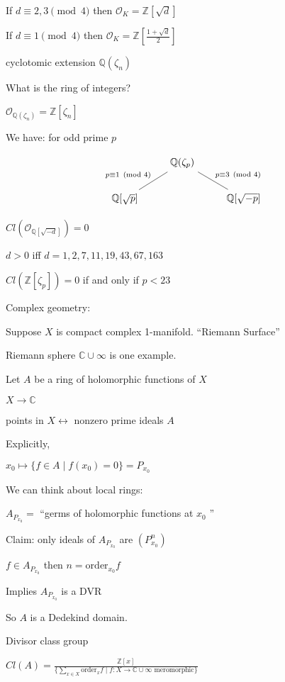 \documentclass{article}
\theoremstyle{definition}
\begin{document}
If \(d \equiv 2,3\pmod 4\) then \(\mathcal{O}_K = \mathbb{Z}[\sqrt{d}]\) 

If \(d \equiv 1\pmod 4\) then \(\mathcal{O}_K = \mathbb{Z}\left[ \frac{1+\sqrt{d}}{2} \right] \) 

cyclotomic extension \(\mathbb{Q}(\zeta_n)\)

What is the ring of integers?

\(\mathcal{O}_{\mathbb{Q}(\zeta_n)}=\mathbb{Z}[\zeta_n]\) 

We have: for odd prime \(p\)

\[
    \begin{tikzcd}
        & \mathbb{Q}(\zeta_p) & \\
        \mathbb{Q} [\sqrt{p}] \ar[ur, no head, "p\equiv 1 \pmod 4"] & & \mathbb{Q}[\sqrt{-p}] \ar[ul, no head, "p\equiv 3\pmod 4",swap]
    \end{tikzcd}
\]

\(Cl(\mathcal{O}_{\mathbb{Q}[\sqrt{-d}]}) = 0\)

\(d > 0\) iff \(d = 1,2,7,11,19,43,67,163\) 

\(Cl(\mathbb{Z}[\zeta_p])=0\) if and only if \(p < 23\) 

Complex geometry:

Suppose \(X\) is compact complex 1-manifold. ``Riemann Surface''

Riemann sphere \(\mathbb{C} \cup \infty\) is one example.

Let \(A\) be a ring of holomorphic functions of \(X\) 

\(X \to \mathbb{C}\) 

points in \(X \leftrightarrow\) nonzero prime ideals \(A\)

Explicitly,

\(x_0 \mapsto \{ f\in A \mid f(x_0)=0 \} = P_{x_0}\) 

We can think about local rings:

\(A_{P_{x_0}}=\) ``germs of holomorphic functions at \(x_0\) '' 

Claim: only ideals of \(A_{P_{x_0}}\) are \((P_{x_0}^n)\) 

\(f\in A_{P_{x_0}}\) then \(n = \text{order}_{x_0} f\)

Implies \(A_{P_{x_0}}\) is a DVR

So \(A\) is a Dedekind domain.

Divisor class group

\(Cl(A)= \frac{\mathbb{Z}[x]}{\{ \sum_{x\in X} \text{order}_x f \mid f: X \to \mathbb{C} \cup \infty \text{ meromorphic} \} }\) 
\end{document}

